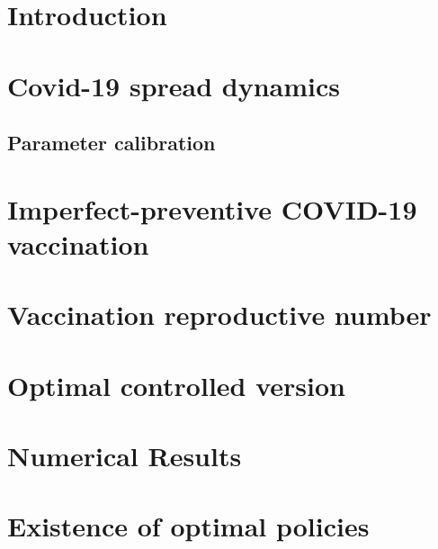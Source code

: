 \documentclass[sort&compress]{elsarticle}
\begin{document}
    \section{Introduction}
        
    \section{Covid-19 spread dynamics}
        
        \subsection{Parameter calibration}
            
    \section{Imperfect-preventive COVID-19 vaccination}
        
    \section{Vaccination reproductive number}
        
    \section{Optimal controlled version}
        
    \section{Numerical Results}
    \listofchanges[style=compactsummary]
    \appendix
  \section{Existence of optimal policies}
    
  
  
\end{document}
